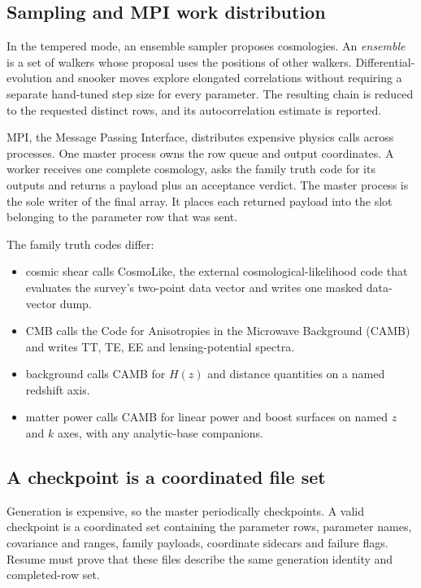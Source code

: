 \documentclass[10pt,aps,prd,twocolumn,nofootinbib]{revtex4-2}
\begin{document}
\subsection{Sampling and MPI work distribution}

In the tempered mode, an ensemble sampler proposes cosmologies.  An
\emph{ensemble} is a set of walkers whose proposal uses the positions of other
walkers.  Differential-evolution and snooker moves explore elongated
correlations without requiring a separate hand-tuned step size for every
parameter.  The resulting chain is reduced to the requested distinct rows,
and its autocorrelation estimate is reported.

MPI, the Message Passing Interface, distributes expensive physics calls
across processes.  One master process owns the row queue and output
coordinates.  A worker receives one complete cosmology, asks the family truth
code for its outputs and returns a payload plus an acceptance verdict.
The master process is the sole writer of the final array.  It places each
returned payload into the slot belonging to the parameter row that was sent.

The family truth codes differ:
\begin{itemize}
  \item cosmic shear calls CosmoLike, the external cosmological-likelihood
        code that evaluates the survey's two-point data vector and writes one
        masked data-vector dump.
  \item CMB calls the Code for Anisotropies in the Microwave Background
        (CAMB) and writes TT, TE, EE and lensing-potential spectra.
  \item background calls CAMB for \(H(z)\) and distance quantities on a named
        redshift axis.
  \item matter power calls CAMB for linear power and boost surfaces on named
        \(z\) and \(k\) axes, with any analytic-base companions.
\end{itemize}

\subsection{A checkpoint is a coordinated file set}

Generation is expensive, so the master periodically checkpoints.  A valid
checkpoint is a coordinated set containing the parameter rows, parameter
names, covariance and ranges,
family payloads, coordinate sidecars and failure flags.  Resume must prove
that these files describe the same generation identity and completed-row set.
\end{document}

